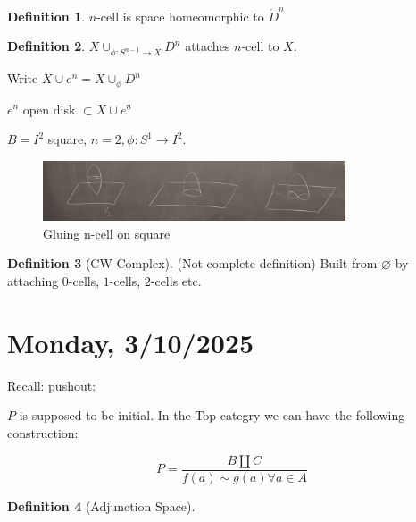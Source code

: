 \documentclass{article}
\theoremstyle{definition}
\newtheorem*{definition}{Definition}
\begin{document}
    \begin{definition}
        \(n\)-cell is space homeomorphic to \(\mathring{D}^n\) 
    \end{definition}

    \begin{definition}
        \(X \cup_{\phi:S^{n-1}\to X} D^n\) attaches \(n\)-cell to \(X\). 
    \end{definition}

    Write \(X \cup e^n = X \cup_{\phi} D^n\)

    \(e^n\) open disk \(\subset X\cup e^n\) 

    \(B = I^2\) square, \(n=2, \phi: S^1 \to I^2\).

    \begin{figure}[H]
        \centering
        \includegraphics[width=0.8\textwidth]{img/ncell}
        \caption{Gluing n-cell on square}
        \label{fig:ncell}
    \end{figure}

    \begin{definition}
        [CW Complex] (Not complete definition) Built from \(\varnothing\) by attaching \(0\)-cells, \(1\)-cells, \(2\)-cells etc.
    \end{definition}

    \section*{Monday, 3/10/2025}
    
    Recall: pushout:

    \begin{center}
    \end{center}

    \(P\) is supposed to be initial. In the Top categry we can have the following construction:

    \[
        P = \frac{B\coprod C}{f(a) \sim g(a) \forall a\in A}
    \]

    \begin{definition}
        [Adjunction Space]

        \begin{center}
        \end{center}
    \end{definition}
\end{document}
